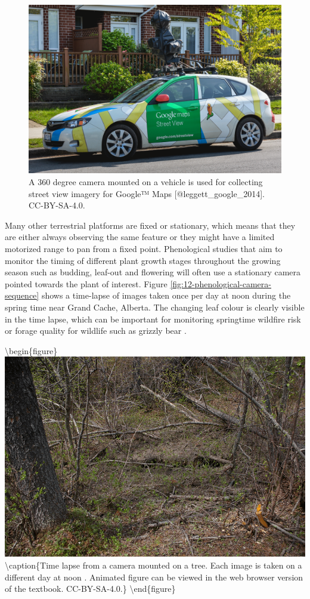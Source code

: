 \documentclass[
]{book}
\begin{document}
\begin{figure}
\includegraphics[width=0.9\linewidth]{images/12-google-street-view-car} \caption{A 360 degree camera mounted on a vehicle is used for collecting street view imagery for Google™ Maps [@leggett_google_2014]. CC-BY-SA-4.0.}\label{fig:12-google-street-view-car}
\end{figure}

Many other terrestrial platforms are fixed or stationary, which means that they are either always observing the same feature or they might have a limited motorized range to pan from a fixed point. Phenological studies that aim to monitor the timing of different plant growth stages throughout the growing season such as budding, leaf-out and flowering will often use a stationary camera pointed towards the plant of interest. Figure \ref{fig:12-phenological-camera-sequence} shows a time-lapse of images taken once per day at noon during the spring time near Grand Cache, Alberta. The changing leaf colour is clearly visible in the time lapse, which can be important for monitoring springtime wildfire risk \citep{pickell_early_2017} or forage quality for wildlife such as grizzly bear \citep{bater_using_2010}.

\textbackslash begin\{figure\}
\includegraphics[width=0.9\linewidth]{images/12-phenological-camera-sequence} \textbackslash caption\{Time lapse from a camera mounted on a tree. Each image is taken on a different day at noon \citep{bater_timelapse_nodate}. Animated figure can be viewed in the web browser version of the textbook. CC-BY-SA-4.0.\}\label{fig:12-phenological-camera-sequence}
\textbackslash end\{figure\}
\end{document}
